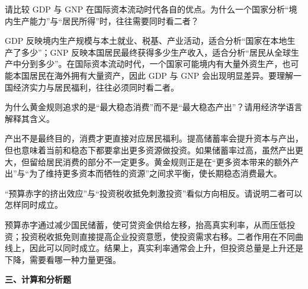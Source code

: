 \begin{question}
请比较 GDP 与 GNP 在国际资本流动时代各自的优点。为什么一个国家分析“境内生产能力”与“居民所得”时，往往需要同时看二者？
\begin{solution}
GDP 反映境内生产规模与本土就业、税基、产业活动，适合分析“国家在本地生产了多少”；GNP 反映本国居民最终获得多少生产收入，适合分析“居民从全球生产中分到多少”。在国际资本流动时代，一个国家可能境内有大量外资生产，也可能本国居民在海外拥有大量资产，因此 GDP 与 GNP 会出现明显差异。要理解一国经济实力与居民福利，往往必须同时看二者。\end{solution}
\end{question}

\begin{question}
为什么黄金规则追求的是“最大稳态消费”而不是“最大稳态产出”？请用经济学语言解释其含义。
\begin{solution}
产出不是最终目的，消费才更直接对应居民福利。提高储蓄率会提升资本与产出，但也意味着当前和稳态下都要拿出更多资源做投资。如果储蓄率过高，虽然产出更大，但留给居民消费的部分不一定更多。黄金规则正是在“更多资本带来的额外产出”与“为了维持更多资本而牺牲的资源”之间求平衡，使长期稳态消费最大。\end{solution}
\end{question}

\begin{question}
“预算赤字的挤出效应”与“投资税收抵免刺激投资”看似方向相反。请说明二者可以怎样同时成立。
\begin{solution}
预算赤字通过减少国民储蓄，使可贷资金供给左移，抬高真实利率，从而压低投资；投资税收抵免则直接提高企业投资意愿，使投资需求右移。二者作用在不同曲线上，因此可以同时成立。结果上，真实利率通常会上升，但投资总量是上升还是下降，需要看哪一种力量更强。\end{solution}
\end{question}

\textbf{三、计算和分析题}

